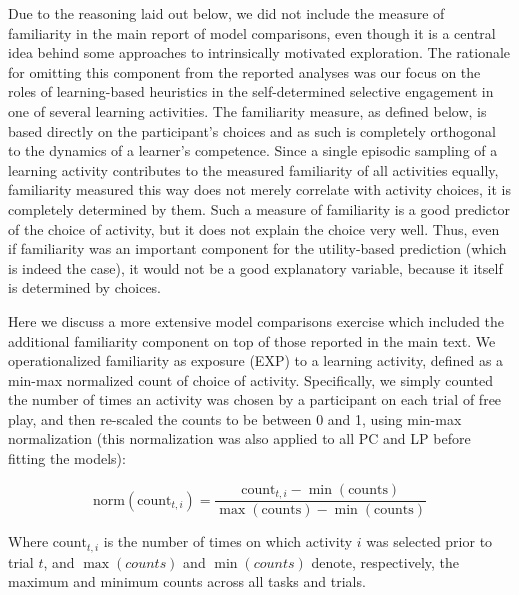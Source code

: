 \begin{subappendices}
Due to the reasoning laid out below, we did not include the measure of familiarity in the main report of model comparisons, even though it is a central idea behind some approaches to intrinsically motivated exploration. The rationale for omitting this component from the reported analyses was our focus on the roles of learning-based heuristics in the self-determined selective engagement in one of several learning activities. The familiarity measure, as defined below, is based directly on the participant’s choices and as such is completely orthogonal to the dynamics of a learner’s competence. Since a single episodic sampling of a learning activity contributes to the measured familiarity of all activities equally, familiarity measured this way does not merely correlate with activity choices, it is completely determined by them. Such a measure of familiarity is a good predictor of the choice of activity, but it does not explain the choice very well. Thus, even if familiarity was an important component for the utility-based prediction (which is indeed the case), it would not be a good explanatory variable, because it itself is determined by choices.

Here we discuss a more extensive model comparisons exercise which included the additional familiarity component on top of those reported in the main text. We operationalized familiarity as exposure (\ac{EXP}) to a learning activity, defined as a min-max normalized count of choice of activity. Specifically, we simply counted the number of times an activity was chosen by a participant on each trial of free play, and then re-scaled the counts to be between 0 and 1, using min-max normalization (this normalization was also applied to all \ac{PC} and \ac{LP} before fitting the models): 

\begin{equation}
    \mathrm{norm}(\mathrm{count}_{t,i}) = \frac{\mathrm{count}_{t,i} - \min(\mathrm{counts})}{\max (\mathrm{counts}) - \min (\mathrm{counts})}
\end{equation}

Where $\mathrm{count}_{t,i}$ is the number of times on which activity $i$ was selected prior to trial $t$, and $\max(counts)$ and $\min(counts)$ denote, respectively, the maximum and minimum counts across all tasks and trials.


\end{subappendices}
